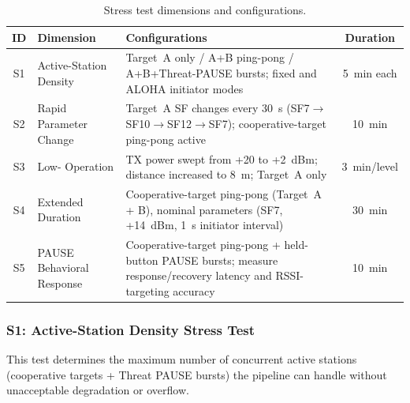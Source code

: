 \documentclass[11pt,letterpaper]{article}
\begin{document}
	\begin{table}[ht!]
		\centering
		\caption{Stress test dimensions and configurations.}
		\label{tab:stress_plan}
		\renewcommand{\arraystretch}{1.3}
		\begin{tabularx}{\textwidth}{c l X c}
			\toprule
			\textbf{ID} & \textbf{Dimension} & \textbf{Configurations} & \textbf{Duration} \\
			\midrule
			S1 & Active-Station Density & Target~A only / A+B ping-pong / A+B+Threat-PAUSE bursts; fixed and ALOHA initiator modes & 5~min each \\
			S2 & Rapid Parameter Change & Target~A SF changes every 30~s (SF7$\to$SF10$\to$SF12$\to$SF7); cooperative-target ping-pong active & 10~min \\
			S3 & Low-\SNR{} Operation & TX power swept from +20 to +2~dBm; distance increased to 8~m; Target~A only & 3~min/level \\
			S4 & Extended Duration & Cooperative-target ping-pong (Target~A + B), nominal parameters (SF7, +14~dBm, 1~s initiator interval) & 30~min \\
			S5 & PAUSE Behavioral Response & Cooperative-target ping-pong + held-button PAUSE bursts; measure response/recovery latency and RSSI-targeting accuracy & 10~min \\
			\bottomrule
		\end{tabularx}
	\end{table}

	\subsubsection{S1: Active-Station Density Stress Test}

	This test determines the maximum number of concurrent active stations (cooperative targets + Threat PAUSE bursts) the pipeline can handle without unacceptable \PER{} degradation or \FIFO{} overflow.
\end{document}
